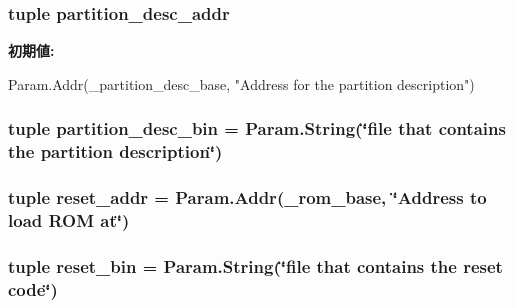 \hypertarget{classSparcSystem_1_1SparcSystem_aeb41644b2431d61ef3d16521627a7bf7}{
\subsubsection[{partition\_\-desc\_\-addr}]{\setlength{\rightskip}{0pt plus 5cm}tuple partition\_\-desc\_\-addr}}
\label{classSparcSystem_1_1SparcSystem_aeb41644b2431d61ef3d16521627a7bf7}
{\bfseries 初期値:}
\begin{DoxyCode}
Param.Addr(_partition_desc_base,
            "Address for the partition description")
\end{DoxyCode}
\hypertarget{classSparcSystem_1_1SparcSystem_ae5417df2a867ff189d8e89954258a521}{
\subsubsection[{partition\_\-desc\_\-bin}]{\setlength{\rightskip}{0pt plus 5cm}tuple partition\_\-desc\_\-bin = Param.String(\char`\"{}file that contains the partition description\char`\"{})}}
\label{classSparcSystem_1_1SparcSystem_ae5417df2a867ff189d8e89954258a521}
\hypertarget{classSparcSystem_1_1SparcSystem_a3a41be5b1b3269a37a1ec40044187614}{
\subsubsection[{reset\_\-addr}]{\setlength{\rightskip}{0pt plus 5cm}tuple reset\_\-addr = {\bf Param.Addr}(\_\-rom\_\-base, \char`\"{}Address to load ROM at\char`\"{})}}
\label{classSparcSystem_1_1SparcSystem_a3a41be5b1b3269a37a1ec40044187614}
\hypertarget{classSparcSystem_1_1SparcSystem_a103bf48ad3f4f84eca7df4e8dd88377b}{
\subsubsection[{reset\_\-bin}]{\setlength{\rightskip}{0pt plus 5cm}tuple reset\_\-bin = Param.String(\char`\"{}file that contains the {\bf reset} code\char`\"{})}}
